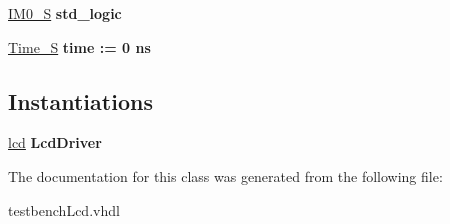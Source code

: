 \begin{DoxyCompactItemize}
\mbox{\label{classtestbenchLcd_1_1behavioural_a05f16ebef9fdb30c6f4e86f1189eb515}} 
\hyperlink{classtestbenchLcd_1_1behavioural_a05f16ebef9fdb30c6f4e86f1189eb515}{I\+M0\+\_\+S} {\bfseries \textcolor{vhdlchar}{std\+\_\+logic}\textcolor{vhdlchar}{ }} 
\item 
\mbox{\label{classtestbenchLcd_1_1behavioural_a0035bbbbe75eab32d24b9cdfe6072461}} 
\hyperlink{classtestbenchLcd_1_1behavioural_a0035bbbbe75eab32d24b9cdfe6072461}{Time\+\_\+S} {\bfseries \textcolor{vhdlchar}{time}\textcolor{vhdlchar}{ }\textcolor{vhdlchar}{ }\textcolor{vhdlchar}{\+:}\textcolor{vhdlchar}{=}\textcolor{vhdlchar}{ }\textcolor{vhdlchar}{ }\textcolor{vhdlchar}{ } \textcolor{vhdldigit}{0} \textcolor{vhdlchar}{ }\textcolor{vhdlchar}{ns}\textcolor{vhdlchar}{ }} 
\end{DoxyCompactItemize}
\subsection*{Instantiations}
 \begin{DoxyCompactItemize}
\item 
\mbox{\label{classtestbenchLcd_1_1behavioural_ad7b4eaf04bb9e3fee84f7cf5025fa071}} 
\hyperlink{classtestbenchLcd_1_1behavioural_ad7b4eaf04bb9e3fee84f7cf5025fa071}{lcd}  {\bfseries Lcd\+Driver}   
\end{DoxyCompactItemize}


The documentation for this class was generated from the following file\+:\begin{DoxyCompactItemize}
\item 
testbench\+Lcd.\+vhdl\end{DoxyCompactItemize}

